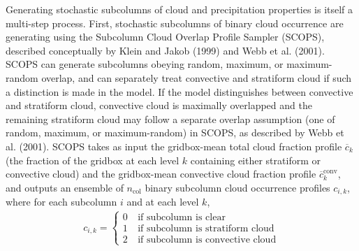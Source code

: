 Generating stochastic subcolumns of cloud and precipitation properties
is itself a multi-step process. First, stochastic subcolumns of binary
cloud occurrence are generating using the Subcolumn Cloud Overlap
Profile Sampler (SCOPS), described conceptually by Klein and Jakob
(1999) and Webb et al. (2001). SCOPS can generate subcolumns obeying
random, maximum, or maximum-random overlap, and can separately treat
convective and stratiform cloud if such a distinction is made in the
model. If the model distinguishes between convective and stratiform
cloud, convective cloud is maximally overlapped and the remaining
stratiform cloud may follow a separate overlap assumption (one of
random, maximum, or maximum-random) in SCOPS, as described by Webb et
al. (2001). SCOPS takes as input the gridbox-mean total cloud fraction
profile \(\overline{c}_k\) (the fraction of the gridbox at each level
\(k\) containing either stratiform or convective cloud) and the
gridbox-mean convective cloud fraction profile
\(\overline{c}^\textrm{conv}_k\), and outputs an ensemble of
\(n_\textrm{col}\) binary subcolumn cloud occurrence profiles
\(c_{i, k}\), where for each subcolumn \(i\) and at each level \(k\),
\[\begin{gathered}
    c_{i, k} = \begin{cases}
         0 & ~\text{if subcolumn is clear} \\
         1 & ~\text{if subcolumn is stratiform cloud} \\
         2 & ~\text{if subcolumn is convective cloud}
    \end{cases}\end{gathered}\]

